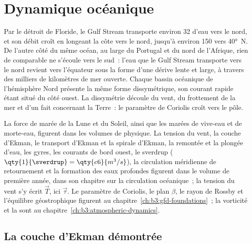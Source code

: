 \chapter{Dynamique océanique}\label{ch:b3:ocean-dynamics}

Par le détroit de Floride, le Gulf Stream transporte environ
\qty{32}{\sverdrup} d'eau vers le nord, et son débit croît en longeant la côte
vers le nord, jusqu'à environ \qty{150}{\sverdrup} vers \ang{40}~N. De l'autre côté du même océan, au large du Portugal et du nord
de l'Afrique, rien de comparable ne s'écoule vers le sud~: l'eau que le Gulf Stream transporte
vers le nord revient vers l'équateur sous la forme d'une dérive lente et large, à travers des milliers
de kilomètres de mer ouverte. Chaque bassin océanique de l'hémisphère Nord présente
la même forme dissymétrique, son courant rapide étant situé du côté ouest. La
dissymétrie découle du vent, du frottement de la mer et
d'un fait concernant la Terre~: le paramètre de Coriolis croît vers le pôle.

\begin{recall}
La force de marée de la Lune et du Soleil, ainsi que les marées de vive-eau et de morte-eau, figurent dans les
volumes de physique. La tension du vent, la couche d'Ekman, le transport d'Ekman et
la spirale d'Ekman, la remontée et la plongée d'eau, les gyres, les courants de
bord ouest, le sverdrup ($\qty{1}{\sverdrup} =
\qty{e6}{m^3/s}$), la circulation méridienne de retournement et la
formation des eaux profondes figurent dans le volume de première année, dans son chapitre sur
la circulation océanique~; la tension du vent s'y écrit $\vec T$, ici
$\vec\tau$. Le paramètre de Coriolis, le plan $\beta$, le rayon de Rossby
et l'équilibre géostrophique figurent au chapitre~\ref{ch:b3:gfd-foundations}~;
la vorticité et la  sont au chapitre~\ref{ch:b3:atmospheric-dynamics}.
\end{recall}

\section{La couche d'Ekman démontrée}\label{sec:b3:ocean-dynamics:ekman}

